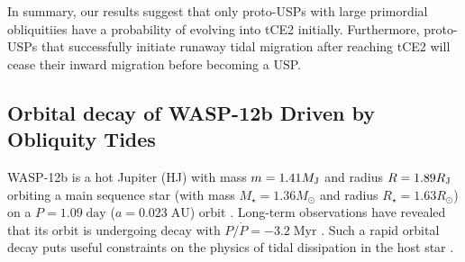 \documentclass[
        fleqn,
        usenatbib,
        referee
    ]{mnras}
\begin{document}
In summary, our results suggest that only proto-USPs with large primordial
obliquitiies have a probability of evolving into tCE2 initially. Furthermore,
proto-USPs that successfully initiate runaway tidal migration after reaching
tCE2 will cease their inward migration before becoming a USP\@.

\subsection{Orbital decay of WASP-12b Driven by Obliquity Tides}\label{ss:disc_wasp12b}

WASP-12b is a hot Jupiter (HJ) with mass $m = 1.41M_{\rm J}$ and radius $R =
1.89R_{\rm J}$ orbiting a main sequence star (with mass $M_\star
= 1.36M_{\odot}$ and radius $R_\star = 1.63R_{\odot}$) on a $P =
1.09\;\mathrm{day}$ ($a = 0.023 \;\mathrm{AU}$) orbit \citet{hebb2009wasp,
maciejewski2013multi}. Long-term observations have revealed
that its orbit is undergoing decay with $P / \dot{P} = -3.2\;\mathrm{Myr}$
\citep{maciejewski2016departure, patra2017apparently}. Such a rapid orbital
decay puts useful constraints on the physics of tidal dissipation in the host
star \citep[e.g.][]{weinberg2017tidal, barker2020tidal}.
\end{document}
